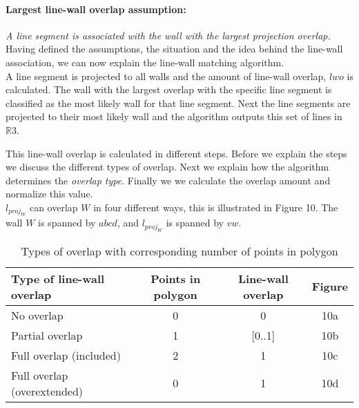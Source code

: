 	\paragraph{Largest line-wall overlap assumption:}
	\emph{A line segment is associated with the wall with the largest projection
	overlap.}\\

	Having defined the assumptions, the situation and the idea behind the
	line-wall association, we can now explain the line-wall matching algorithm.\\ 

	A line segment is projected to all walls and the amount of line-wall
	overlap, $lwo$ is calculated. The wall with the largest overlap with the specific line
segment is classified as the most likely wall for that line segment.
	Next the line segments are projected to their most likely wall and the
	algorithm outputs this set of lines in $\mathbb{R}3$. 
	

	This line-wall overlap is calculated in different steps.
	Before we explain the steps we discuss the different types of overlap. Next
	we explain how the algorithm determines the \emph{overlap type}. Finally we
	we calculate the overlap amount and normalize this value.\\

	$l_{proj_W}$ can overlap $W$ in four different ways, this is illustrated 
	in Figure 10. The wall $W$ is spanned by $abcd$, and $l_{proj_W}$ is spanned
	by $vw$.
	
		
	\newpage


	\begin{table}[ht]
		\caption{Types of overlap with corresponding number of points in polygon}
		\label{tab:lwatypes}

		\begin{tabular}{|l||c|c|c|}
		\hline
		Type of line-wall overlap 			&	Points in polygon 			& Line-wall overlap & Figure \\
		\hline
		\hline
		No overlap					&	0					& 0		& 10a\\
		\hline
		Partial overlap 				&	1					& [0..1]	& 10b\\
		\hline
		Full overlap (included)		&	2					& 1		& 10c\\
		\hline
		Full overlap (overextended)		&  	0					& 1 		& 10d\\
		\hline
		\end{tabular}
	\end{table}
	\clearpage

